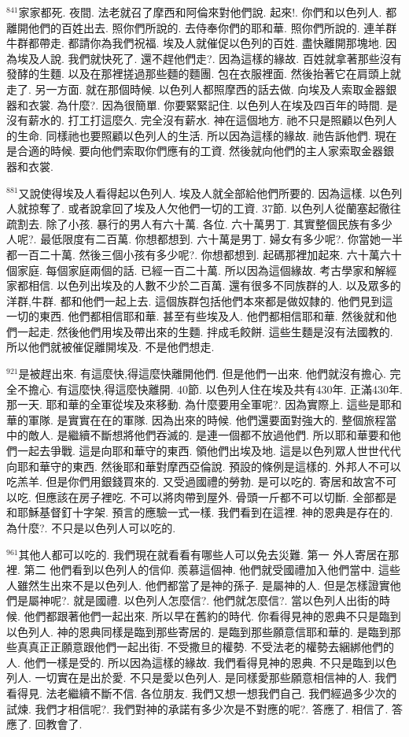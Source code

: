 \documentclass{book}
\begin{document}
$^{841}$家家都死.
夜間.
法老就召了摩西和阿倫來對他們說.
起來!.
你們和以色列人.
都離開他們的百姓出去.
照你們所說的.
去侍奉你們的耶和華.
照你們所說的.
連羊群牛群都帶走.
都請你為我們祝福.
埃及人就催促以色列的百姓.
盡快離開那塊地.
因為埃及人說.
我們就快死了.
還不趕他們走?.
因為這樣的緣故.
百姓就拿著那些沒有發酵的生麵.
以及在那裡搓過那些麵的麵團.
包在衣服裡面.
然後抬著它在肩頭上就走了.
另一方面.
就在那個時候.
以色列人都照摩西的話去做.
向埃及人索取金器銀器和衣裳.
為什麼?.
因為很簡單.
你要緊緊記住.
以色列人在埃及四百年的時間.
是沒有薪水的.
打工打這麼久.
完全沒有薪水.
神在這個地方.
祂不只是照顧以色列人的生命.
同樣祂也要照顧以色列人的生活.
所以因為這樣的緣故.
祂告訴他們.
現在是合適的時候.
要向他們索取你們應有的工資.
然後就向他們的主人家索取金器銀器和衣裳.

$^{881}$又說使得埃及人看得起以色列人.
埃及人就全部給他們所要的.
因為這樣.
以色列人就掠奪了.
或者說拿回了埃及人欠他們一切的工資.
37節.
以色列人從蘭塞起徹往疏割去.
除了小孩.
暴行的男人有六十萬.
各位.
六十萬男丁.
其實整個民族有多少人呢?.
最低限度有二百萬.
你想都想到.
六十萬是男丁.
婦女有多少呢?.
你當她一半都一百二十萬.
然後三個小孩有多少呢?.
你想都想到.
起碼那裡加起來.
六十萬六十個家庭.
每個家庭兩個的話.
已經一百二十萬.
所以因為這個緣故.
考古學家和解經家都相信.
以色列出埃及的人數不少於二百萬.
還有很多不同族群的人.
以及眾多的洋群,牛群.
都和他們一起上去.
這個族群包括他們本來都是做奴隸的.
他們見到這一切的東西.
他們都相信耶和華.
甚至有些埃及人.
他們都相信耶和華.
然後就和他們一起走.
然後他們用埃及帶出來的生麵.
拌成毛餃餅.
這些生麵是沒有法國教的.
所以他們就被催促離開埃及.
不是他們想走.

$^{921}$是被趕出來.
有這麼快,得這麼快離開他們.
但是他們一出來.
他們就沒有擔心.
完全不擔心.
有這麼快,得這麼快離開.
40節.
以色列人住在埃及共有430年.
正滿430年.
那一天.
耶和華的全軍從埃及來移動.
為什麼要用全軍呢?.
因為實際上.
這些是耶和華的軍隊.
是實實在在的軍隊.
因為出來的時候.
他們還要面對強大的.
整個旅程當中的敵人.
是繼續不斷想將他們吞滅的.
是連一個都不放過他們.
所以耶和華要和他們一起去爭戰.
這是向耶和華守的東西.
領他們出埃及地.
這是以色列眾人世世代代向耶和華守的東西.
然後耶和華對摩西亞倫說.
預設的條例是這樣的.
外邦人不可以吃羔羊.
但是你們用銀錢買來的.
又受過國禮的勞勃.
是可以吃的.
寄居和故宮不可以吃.
但應該在房子裡吃.
不可以將肉帶到屋外.
骨頭一斤都不可以切斷.
全部都是和耶穌基督釘十字架.
預言的應驗一式一樣.
我們看到在這裡.
神的恩典是存在的.
為什麼?.
不只是以色列人可以吃的.

$^{961}$其他人都可以吃的.
我們現在就看看有哪些人可以免去災難.
第一 外人寄居在那裡.
第二 他們看到以色列人的信仰.
羨慕這個神.
他們就受國禮加入他們當中.
這些人雖然生出來不是以色列人.
他們都當了是神的孫子.
是屬神的人.
但是怎樣證實他們是屬神呢?.
就是國禮.
以色列人怎麼信?.
他們就怎麼信?.
當以色列人出街的時候.
他們都跟著他們一起出來.
所以早在舊約的時代.
你看得見神的恩典不只是臨到以色列人.
神的恩典同樣是臨到那些寄居的.
是臨到那些願意信耶和華的.
是臨到那些真真正正願意跟他們一起出街.
不受撒旦的權勢.
不受法老的權勢去綑綁他們的人.
他們一樣是受的.
所以因為這樣的緣故.
我們看得見神的恩典.
不只是臨到以色列人.
一切實在是出於愛.
不只是愛以色列人.
是同樣愛那些願意相信神的人.
我們看得見.
法老繼續不斷不信.
各位朋友.
我們又想一想我們自己.
我們經過多少次的試煉.
我們才相信呢?.
我們對神的承諾有多少次是不對應的呢?.
答應了.
相信了.
答應了.
回教會了.
\end{document}
